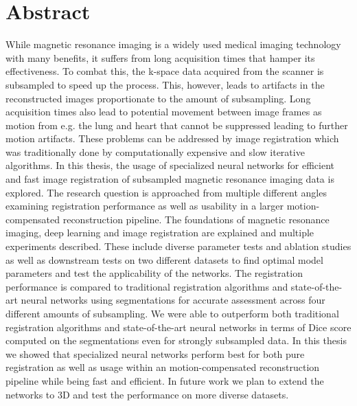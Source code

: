 \chapter*{Abstract}
While magnetic resonance imaging is a widely used medical imaging technology with many benefits, it suffers from long acquisition times that hamper its effectiveness. 
To combat this, the k-space data acquired from the scanner is subsampled to speed up the process. 
This, however, leads to artifacts in the reconstructed images proportionate to the amount of subsampling.
Long acquisition times also lead to potential movement between image frames as motion from e.g. the lung and heart that cannot be suppressed leading to further motion artifacts. These problems can be addressed by image registration which was traditionally done by computationally expensive and slow iterative algorithms. In this thesis, the usage of specialized neural networks for efficient and fast image registration of subsampled magnetic resonance imaging data is explored. The research question is approached from multiple different angles examining registration performance as well as usability in a larger motion-compensated reconstruction pipeline. The foundations of magnetic resonance imaging, deep learning and image registration are explained and multiple experiments described. These include diverse parameter tests and ablation studies as well as downstream tests on two different datasets to find optimal model parameters and test the applicability of the networks. The registration performance is compared to traditional registration algorithms and state-of-the-art neural networks using segmentations for accurate assessment across four different amounts of subsampling. We were able to outperform both traditional registration algorithms and state-of-the-art neural networks in terms of Dice score computed on the segmentations even for strongly subsampled data. In this thesis we showed that specialized neural networks perform best for both pure registration as well as usage within an motion-compensated reconstruction pipeline while being fast and efficient. In future work we plan to extend the networks to 3D and test the performance on more diverse datasets.

